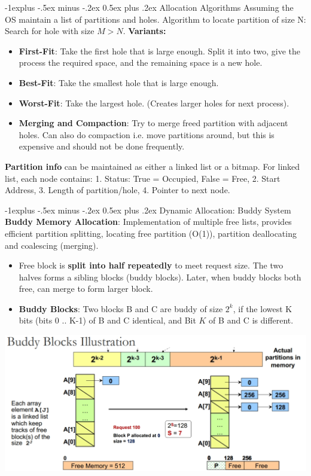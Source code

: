 \documentclass[10pt, landscape]{article}
\makeatletter
\renewcommand{\subsection}{\@startsection{subsection}{2}{0mm}%
                                {-1explus -.5ex minus -.2ex}%
                                {0.5ex plus .2ex}%
                                {\normalfont\normalsize\bfseries}}
\makeatother
\begin{document}
\begin{multicols*}{3}
\subsection{Allocation Algorithms}
Assuming the OS maintain a list of partitions and holes. Algorithm to locate partition of size N: Search for hole with size $M > N$. \textbf{Variants:}
\begin{itemize}
\item \textbf{First-Fit}: Take the first hole that is large enough. Split it into two, give the process the required space, and the remaining space is a new hole.
\item \textbf{Best-Fit}: Take the smallest hole that is large enough.
\item \textbf{Worst-Fit}: Take the largest hole. (Creates larger holes for next process).
\item \textbf{Merging and Compaction}: Try to merge freed partition with adjacent holes. Can also do compaction i.e. move partitions around,
but this is expensive and should not be done frequently.
\end{itemize}
\textbf{Partition info} can be maintained as either a linked list or a bitmap. For linked list, each node contains: 1. Status: True = Occupied, False = Free, 2. Start Address, 3. Length of partition/hole, 4. Pointer to next node.


\subsection{Dynamic Allocation: Buddy System}
\textbf{Buddy Memory Allocation}: Implementation of multiple free lists, provides efficient partition splitting, locating free partition (O(1)), partition deallocating and coalescing (merging).
\begin{itemize}
\item Free block is \textbf{split into half repeatedly} to meet request size. The two halves forms a sibling blocks (buddy blocks). Later, when buddy blocks both free, can merge to form larger block.
\item \textbf{Buddy Blocks}: Two blocks B and C are buddy of size $2^k$, if the lowest K bits (bits 0 .. K-1) of B and C identical, and Bit $K$ of B and C is different.
\end{itemize}
\centerline{\includegraphics[width=0.8\linewidth]{buddyBlocks}}


\end{multicols*}
\end{document}

